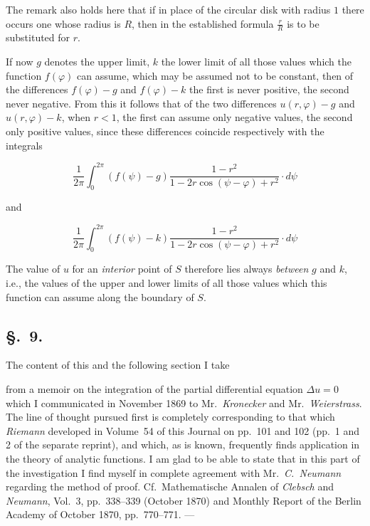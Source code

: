 \documentclass{article}
\begin{document}
The remark also holds here that if in place of the circular disk with radius $1$ there occurs one whose radius is $R$, then in the established formula $\frac{r}{R}$ is to be substituted for $r$.



If now $g$ denotes the upper limit, $k$ the lower limit of all those values which the function $f(\varphi)$ can assume, which may be assumed not to be constant, then of the differences $f(\varphi) - g$ and $f(\varphi) - k$ the first is never positive, the second never negative. From this it follows that of the two differences $u(r, \varphi) - g$ and $u(r, \varphi) - k$, when $r < 1$, the first can assume only negative values, the second only positive values, since these differences coincide respectively with the integrals

\[

\frac{1}{2\pi} \int_0^{2\pi} (f(\psi) - g) \frac{1 - r^2}{1 - 2r \cos(\psi - \varphi) + r^2} \cdot d\psi

\]

and

\[

\frac{1}{2\pi} \int_0^{2\pi} (f(\psi) - k) \frac{1 - r^2}{1 - 2r \cos(\psi - \varphi) + r^2} \cdot d\psi

\]



The value of $u$ for an \emph{interior} point of $S$ therefore lies always \emph{between} $g$ and $k$, i.e., the values of the upper and lower limits of all those values which this function can assume along the boundary of $S$.



\subsection*{§.~9.}



The content of this and the following section I take




from a memoir on the integration of the partial differential equation $\Delta u = 0$ which I communicated in November 1869 to Mr.~\emph{Kronecker} and Mr.~\emph{Weierstrass}. The line of thought pursued first is completely corresponding to that which \emph{Riemann} developed in Volume~54 of this Journal on pp.~101 and 102 (pp.~1 and 2 of the separate reprint), and which, as is known, frequently finds application in the theory of analytic functions. I am glad to be able to state that in this part of the investigation I find myself in complete agreement with Mr.~\emph{C.~Neumann} regarding the method of proof. Cf.~Mathematische Annalen of \emph{Clebsch} and \emph{Neumann}, Vol.~3, pp.~338--339 (October 1870) and Monthly Report of the Berlin Academy of October 1870, pp.~770--771. ---
\end{document}
